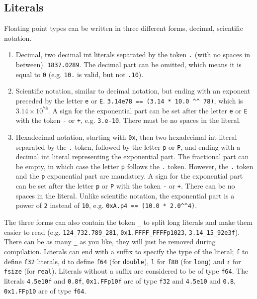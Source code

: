 \subsection{Literals}
\label{sec:orgfd9f825}

Floating point types can be written in three different forms, decimal,
scientific notation.

\begin{enumerate}
\item Decimal, two decimal int literals separated by the token \texttt{.} (with
  no spaces in between). \texttt{1837.0289}. The decimal part can be omitted,
  which means it is equal to \texttt{0} (e.g. \texttt{10.} is valid, but not
  \texttt{.10}).

\item Scientific notation, similar to decimal notation, but ending with an
  exponent preceded by the letter \texttt{e} or \texttt{E}. \texttt{3.14e78 ==
    (3.14 * 10.0 \textasciicircum{}\textasciicircum{} 78)}, which is \(3.14
  \times 10^{78}\). A sign for the exponential part can be set after the letter
  \texttt{e} or \texttt{E} with the token \texttt{-} or \texttt{+}, e.g.
  \texttt{3.e-10}. There must be no spaces in the literal.

\item Hexadecimal notation, starting with \texttt{0x}, then two hexadecimal int
  literal separated by the \texttt{.} token, followed by the letter \texttt{p}
  or \texttt{P}, and ending with a decimal int literal representing the
  exponential part. The fractional part can be empty, in which case the letter
  \texttt{p} follows the \texttt{.} token. However, the \texttt{.} token and the
  \texttt{p} exponential part are mandatory. A sign for the exponential part can
  be set after the letter \texttt{p} or \texttt{P} with the token \texttt{-} or
  \texttt{+}. There can be no spaces in the literal. Unlike scientific notation,
  the exponential part is a power of \texttt{2} instead of \texttt{10}, e.g.
  \texttt{0xA.p4 == (10.0 * 2.0\textasciicircum{}\textasciicircum{}4)}.

\end{enumerate}

The three forms can also contain the token \texttt{\_} to split long literals
and make them easier to read (e.g. \texttt{124\_732.789\_281},
\texttt{0x1.FFFF\_FFFFp1023}, \texttt{3.14\_15\_92e3f}). There can be as many
\texttt{\_} as you like, they will just be removed during compilation. Literals
can end with a suffix to specify the type of the literal; \texttt{f} to define
\texttt{f32} literals, \texttt{d} to define \texttt{f64} (for \texttt{double}),
\texttt{l} for \texttt{f80} (for \texttt{long}) and \texttt{r} for
\texttt{fsize} (for \texttt{real}). Literals without a suffix are considered to
be of type \texttt{f64}. The literals \texttt{4.5e10f} and \texttt{0.8f},
\texttt{0x1.FFp10f} are of type \texttt{f32} and \texttt{4.5e10} and
\texttt{0.8}, \texttt{0x1.FFp10} are of type \texttt{f64}.

